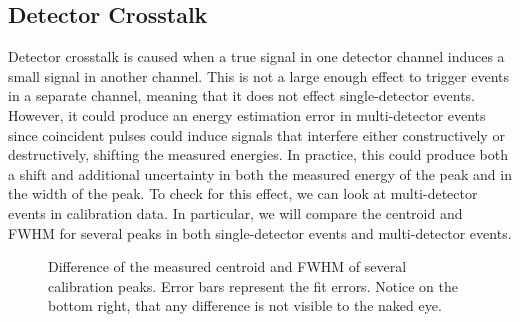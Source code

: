 \documentclass[/main.tex]{subfiles}
\begin{document}
\subsection{Detector Crosstalk} \label{sec:crosstalk}
Detector crosstalk is caused when a true signal in one detector channel induces a small signal in another channel.
This is not a large enough effect to trigger events in a separate channel, meaning that it does not effect single-detector events.
However, it could produce an energy estimation error in multi-detector events since coincident pulses could induce signals that interfere either constructively or destructively, shifting the measured energies.
In practice, this could produce both a shift and additional uncertainty in both the measured energy of the peak and in the width of the peak.
To check for this effect, we can look at multi-detector events in  calibration data.
In particular, we will compare the centroid and FWHM for several peaks in both single-detector events and multi-detector events.
\begin{figure}[p]
  \centering
  \caption[Peak shape comparison for single- and multi-detector events]{\label{fig:xtalk}
    Difference of the measured centroid and FWHM of several  calibration peaks. Error bars represent the fit errors. Notice on the bottom right, that any difference is not visible to the naked eye.
  }
\end{figure}
\end{document}
